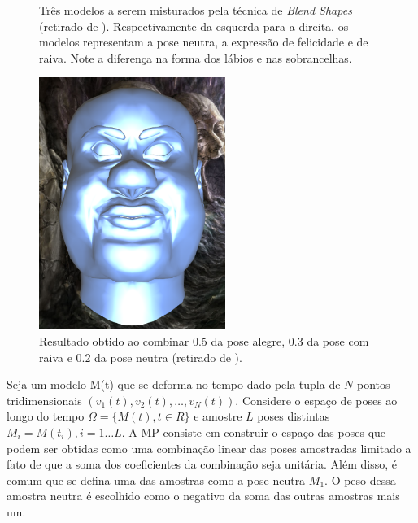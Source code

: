 {\begin{figure}[!htb]
\caption{Três modelos a serem misturados pela técnica de \textit{Blend Shapes} (retirado de \cite{tutorial-supremo-on-blend-shapes}). Respectivamente da esquerda para a direita, os modelos representam a pose neutra, a expressão de felicidade e de raiva. Note a diferença na forma dos lábios e nas sobrancelhas.}

\label{fig:blend-shapes-example-input} 
\end{figure}

\begin{figure}[!htb]
   \centering
  \includegraphics[width=0.6\linewidth]{./figs/outputOfBlendShapes.png}

\caption{Resultado obtido ao combinar 0.5 da pose alegre, 0.3 da pose com raiva e 0.2 da pose neutra (retirado de \cite{tutorial-supremo-on-blend-shapes}).}

\label{fig:blend-shapes-example-output} 
\end{figure}

    
    Seja um modelo M(t) que se deforma no tempo dado pela tupla de $N$ pontos tridimensionais $ ( v_1(t), v_2(t), \ldots,  v_N(t))$. Considere o espaço de poses ao longo do tempo $\Omega = \{ M(t), t \in R\}$  e amostre $L$ poses distintas $M_i = M(t_i), i = 1 \ldots L$. A MP consiste em construir o espaço das poses que podem ser obtidas como uma combinação linear das poses amostradas limitado a fato de que a soma dos coeficientes da combinação seja unitária. Além disso, é comum que se defina uma das amostras como a pose neutra $M_1$. O peso dessa amostra neutra é escolhido como o negativo da soma das outras amostras mais um.
    
}
